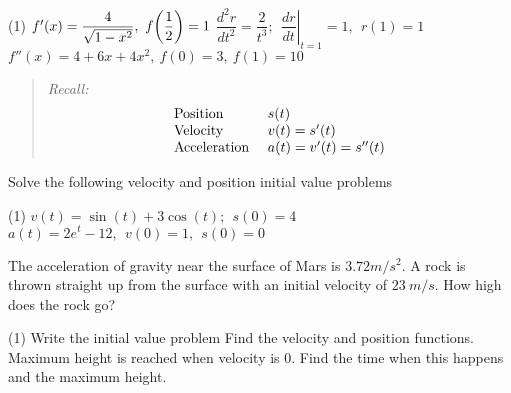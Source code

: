 \documentclass[mathNotesPreamble]{subfiles}
\begin{document}
  \begin{tasks}[after-item-skip=\stretch{1}, label=\mbox{}](1)
    \task $f'(x)=\dfrac{4}{\sqrt{1-x^2}},\ f\parens{\dfrac{1}{2}}=1$
    \task $\dfrac{d^2r}{dt^2}=\dfrac{2}{t^3};\ \ \left.\dfrac{dr}{dt}\right|_{t=1}=1,\ \ r(1)=1$
    \task $f''(x)=4+6x+4x^2,\ f(0)=3,\ f(1)=10$
  \end{tasks}
  \pagebreak
  
  \noindent
  \begin{quote}
    \textit{Recall:}
      \[\begin{array}{ll}
          \textnormal{Position }& s(t)\\
          \textnormal{Velocity }& v(t)=s'(t)\\
          \textnormal{Acceleration }& a(t)=v'(t)=s''(t)
        \end{array}\]
  \end{quote}
  \begin{ex*}
    Solve the following velocity and position initial value problems
  \end{ex*}
  \begin{tasks}[after-item-skip=\stretch{1}, label=\mbox{}](1)
    \task $v(t)=\sin(t)+3\cos(t);\ \ s(0)=4$
    \task $a(t)=2e^t-12,\ \ v(0)=1,\ \ s(0)=0$
  \end{tasks}
  \pagebreak
  
  \begin{ex*}
    The acceleration of gravity near the surface of Mars is $3.72 m/s^2$. A rock is thrown straight up from the surface with an initial velocity of $23\ m/s$. How high does the rock go?
  \end{ex*}
  \begin{tasks}[after-item-skip=\stretch{1}](1)
    \task Write the initial value problem
    \task Find the velocity and position functions.
    \task Maximum height is reached when velocity is 0. Find the time when this happens and the maximum height.
  \end{tasks}
  \pagebreak
  
\end{document}
